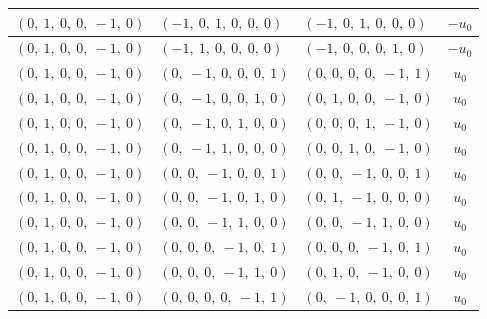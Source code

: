 \documentclass[11pt]{article}
\theoremstyle{definition}
\begin{document}
\begin{longtable}{|l|l|l|c|}
    \hline
    $\left( 0, \  1, \  0, \  0, \  -1, \  0\right)$ & $\left( -1, \  0, \  1, \  0, \  0, \  0\right)$ & $\left( -1, \  0, \  1, \  0, \  0, \  0\right)$ & $- u_{0}$ \\
    \hline
    $\left( 0, \  1, \  0, \  0, \  -1, \  0\right)$ & $\left( -1, \  1, \  0, \  0, \  0, \  0\right)$ & $\left( -1, \  0, \  0, \  0, \  1, \  0\right)$ & $- u_{0}$ \\
    \hline
    $\left( 0, \  1, \  0, \  0, \  -1, \  0\right)$ & $\left( 0, \  -1, \  0, \  0, \  0, \  1\right)$ & $\left( 0, \  0, \  0, \  0, \  -1, \  1\right)$ & $u_{0}$ \\
    \hline
    $\left( 0, \  1, \  0, \  0, \  -1, \  0\right)$ & $\left( 0, \  -1, \  0, \  0, \  1, \  0\right)$ & $\left( 0, \  1, \  0, \  0, \  -1, \  0\right)$ & $u_{0}$ \\
    \hline
    $\left( 0, \  1, \  0, \  0, \  -1, \  0\right)$ & $\left( 0, \  -1, \  0, \  1, \  0, \  0\right)$ & $\left( 0, \  0, \  0, \  1, \  -1, \  0\right)$ & $u_{0}$ \\
    \hline
    $\left( 0, \  1, \  0, \  0, \  -1, \  0\right)$ & $\left( 0, \  -1, \  1, \  0, \  0, \  0\right)$ & $\left( 0, \  0, \  1, \  0, \  -1, \  0\right)$ & $u_{0}$ \\
    \hline
    $\left( 0, \  1, \  0, \  0, \  -1, \  0\right)$ & $\left( 0, \  0, \  -1, \  0, \  0, \  1\right)$ & $\left( 0, \  0, \  -1, \  0, \  0, \  1\right)$ & $u_{0}$ \\
    \hline
    $\left( 0, \  1, \  0, \  0, \  -1, \  0\right)$ & $\left( 0, \  0, \  -1, \  0, \  1, \  0\right)$ & $\left( 0, \  1, \  -1, \  0, \  0, \  0\right)$ & $u_{0}$ \\
    \hline
    $\left( 0, \  1, \  0, \  0, \  -1, \  0\right)$ & $\left( 0, \  0, \  -1, \  1, \  0, \  0\right)$ & $\left( 0, \  0, \  -1, \  1, \  0, \  0\right)$ & $u_{0}$ \\
    \hline
    $\left( 0, \  1, \  0, \  0, \  -1, \  0\right)$ & $\left( 0, \  0, \  0, \  -1, \  0, \  1\right)$ & $\left( 0, \  0, \  0, \  -1, \  0, \  1\right)$ & $u_{0}$ \\
    \hline
    $\left( 0, \  1, \  0, \  0, \  -1, \  0\right)$ & $\left( 0, \  0, \  0, \  -1, \  1, \  0\right)$ & $\left( 0, \  1, \  0, \  -1, \  0, \  0\right)$ & $u_{0}$ \\
    \hline
    $\left( 0, \  1, \  0, \  0, \  -1, \  0\right)$ & $\left( 0, \  0, \  0, \  0, \  -1, \  1\right)$ & $\left( 0, \  -1, \  0, \  0, \  0, \  1\right)$ & $u_{0}$ \\

\end{longtable}
\end{document}
